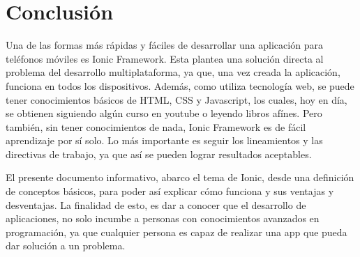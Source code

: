 \section{Conclusión}

Una de las formas más rápidas y fáciles de desarrollar una aplicación para teléfonos móviles es Ionic Framework. Esta plantea una solución directa al problema del desarrollo multiplataforma, ya que, una vez creada la aplicación, funciona en todos los dispositivos. Además, como utiliza tecnología web, se puede tener conocimientos básicos de HTML, CSS y Javascript, los cuales, hoy en día, se obtienen siguiendo algún curso en youtube o leyendo libros afínes. Pero también, sin tener conocimientos de nada, Ionic Framework es de fácil aprendizaje por sí solo. Lo más importante es seguir los lineamientos y las directivas de trabajo, ya que así se pueden lograr resultados aceptables.

El presente documento informativo, abarco el tema de Ionic, desde una definición de conceptos básicos, para poder así explicar cómo funciona y sus ventajas y desventajas. La finalidad de esto, es dar a conocer que el desarrollo de aplicaciones, no solo incumbe a personas con conocimientos avanzados en programación, ya que cualquier persona es capaz de realizar una app que pueda dar solución a un problema.